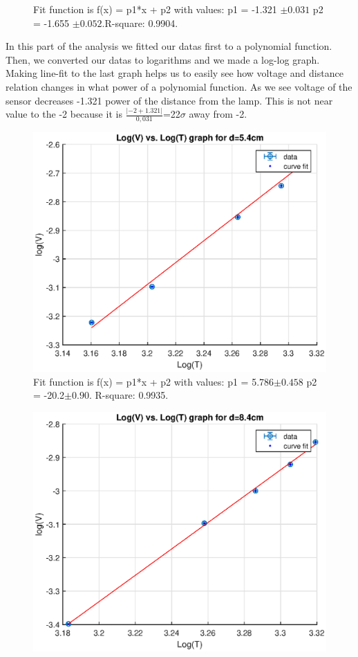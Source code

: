 \documentclass[11pt,a4paper]{article}
\begin{document}
{\begin{figure}[H]
\begin{center}
	\end{center}
	\caption{Fit function is  f(x) = p1*x + p2 with values: p1 =      -1.321 $\pm0.031$ 
		p2 =      -1.655 $\pm0.052$.R-square: 0.9904.}
\end{figure}
In this part of the analysis we fitted our datas first to a polynomial function. Then, we converted our datas to logarithms and we made a log-log graph. Making line-fit to the last graph helps us to easily see how voltage and distance relation changes in what power of a polynomial function. As we see voltage of the sensor decreases -1.321 power of the distance from the lamp. This is not near value to the -2 because it is $\frac{\left|-2+1.321\right|}{0,031}$=22$\sigma$ away from -2.
\begin{figure}[H]
	\begin{center}
		\includegraphics[scale=0.7]{d5.eps}
	\end{center}
	\caption{Fit function is f(x) = p1*x + p2 with values:  p1 =       5.786$\pm0.458$  
		p2 =       -20.2$ \pm 0.90$. R-square: 0.9935.}
\end{figure}
\begin{figure}[H]
	\begin{center}
		\includegraphics[scale=0.7]{d8.eps}

\end{center}
\end{figure}}
\end{document}
